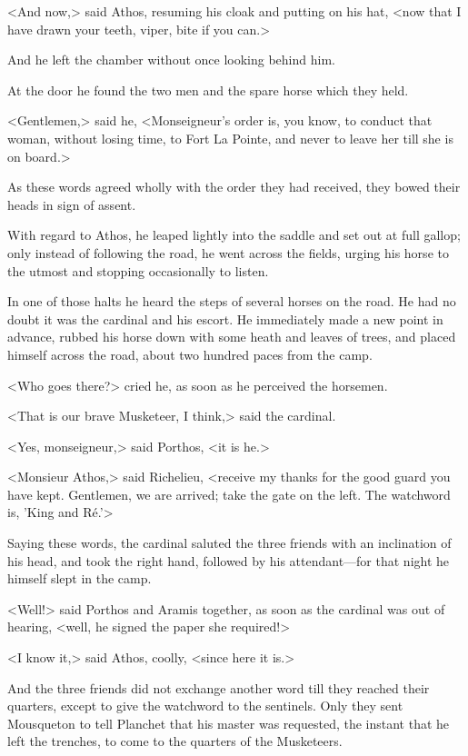 <And now,> said Athos, resuming his cloak and putting on his hat, <now that I have drawn your teeth, viper, bite if you can.> 

And he left the chamber without once looking behind him. 

At the door he found the two men and the spare horse which they held. 

<Gentlemen,> said he, <Monseigneur's order is, you know, to conduct that woman, without losing time, to Fort La Pointe, and never to leave her till she is on board.> 

As these words agreed wholly with the order they had received, they bowed their heads in sign of assent. 

With regard to Athos, he leaped lightly into the saddle and set out at full gallop; only instead of following the road, he went across the fields, urging his horse to the utmost and stopping occasionally to listen. 

In one of those halts he heard the steps of several horses on the road. He had no doubt it was the cardinal and his escort. He immediately made a new point in advance, rubbed his horse down with some heath and leaves of trees, and placed himself across the road, about two hundred paces from the camp. 

<Who goes there?> cried he, as soon as he perceived the horsemen. 

<That is our brave Musketeer, I think,> said the cardinal. 

<Yes, monseigneur,> said Porthos, <it is he.> 

<Monsieur Athos,> said Richelieu, <receive my thanks for the good guard you have kept. Gentlemen, we are arrived; take the gate on the left. The watchword is, 'King and Ré.'> 

Saying these words, the cardinal saluted the three friends with an inclination of his head, and took the right hand, followed by his attendant---for that night he himself slept in the camp. 

<Well!> said Porthos and Aramis together, as soon as the cardinal was out of hearing, <well, he signed the paper she required!> 

<I know it,> said Athos, coolly, <since here it is.> 

And the three friends did not exchange another word till they reached their quarters, except to give the watchword to the sentinels. Only they sent Mousqueton to tell Planchet that his master was requested, the instant that he left the trenches, to come to the quarters of the Musketeers. 

